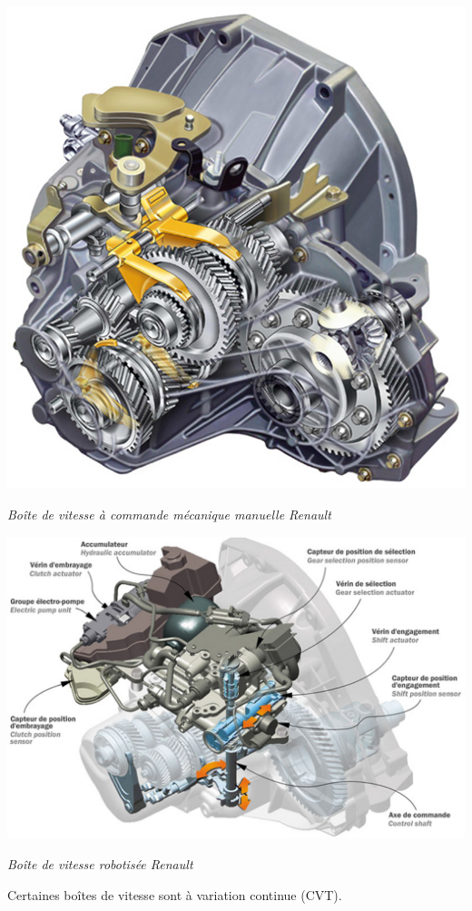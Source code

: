 \documentclass[11pt,oneside]{article}
\begin{document}
\begin{minipage}[c]{.4\linewidth}
\begin{center}
\includegraphics[width=.8\textwidth]{png/fig_92}

\textit{Boîte de vitesse à commande mécanique manuelle  Renault}
\end{center}
\end{minipage} \hfill
\begin{minipage}[c]{.55\linewidth}
\begin{center}
\includegraphics[width=.8\textwidth]{png/fig_93}

\textit{Boîte de vitesse robotisée Renault}

\end{center}
\end{minipage}


Certaines boîtes de vitesse sont à variation continue (CVT).
\end{document}
